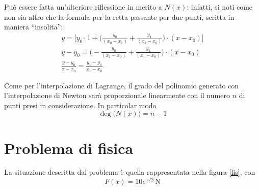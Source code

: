 Può essere fatta un'ulteriore riflessione in merito a $N(x)$: infatti, si noti come non sia altro che la formula per la retta passante per due punti, scritta in maniera ``insolita'':
\begin{gather*}
y=\Bigg[y_0\cdot1+\Bigg(\frac{y_0}{(x_0-x_1)}+\frac{y_1}{(x_1-x_0)}\Bigg)\cdot(x-x_0)\Bigg]\\
y-y_0=\Bigg(-\frac{y_0}{(x_1-x_0)}+\frac{y_1}{(x_1-x_0)}\Bigg)\cdot(x-x_0)\\
\frac{y-y_0}{x-x_0}=\frac{y_1-y_0}{x_1-x_0}
\end{gather*}

Come per l'interpolazione di Lagrange, il grado del polinomio generato con l'interpolazione di Newton sarà proporzionale linearmente con il numero $n$ di punti presi in considerazione. In particolar modo
\[
\deg \big(N(x)\big)=n-1
\] 

\chapter{Problema di fisica}

La situazione descritta dal problema è quella rappresentata nella figura \ref{fis}, con
\[F(x)=10e^{x/2}\,\text{N}\]

\begin{figure}
\end{figure}

